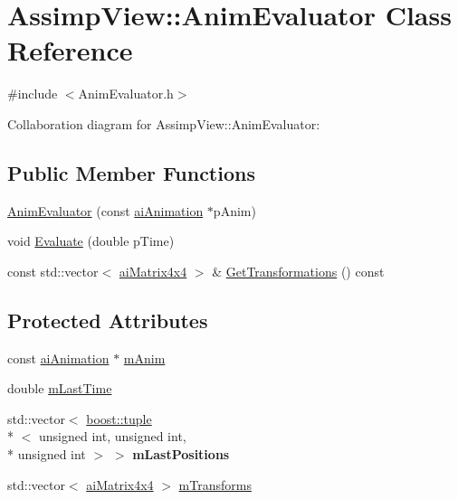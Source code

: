 \hypertarget{class_assimp_view_1_1_anim_evaluator}{\section{Assimp\+View\+:\+:Anim\+Evaluator Class Reference}
\label{class_assimp_view_1_1_anim_evaluator}
}


{\ttfamily \#include $<$Anim\+Evaluator.\+h$>$}



Collaboration diagram for Assimp\+View\+:\+:Anim\+Evaluator\+:
\subsection*{Public Member Functions}
\begin{DoxyCompactItemize}
\item 
\hyperlink{class_assimp_view_1_1_anim_evaluator_a271264baf8bdbb2ca6169be7f2067c59}{Anim\+Evaluator} (const \hyperlink{structai_animation}{ai\+Animation} $\ast$p\+Anim)
\item 
void \hyperlink{class_assimp_view_1_1_anim_evaluator_ad54be6d3b474ab3753b12c6996bc2852}{Evaluate} (double p\+Time)
\item 
const std\+::vector$<$ \hyperlink{structai_matrix4x4}{ai\+Matrix4x4} $>$ \& \hyperlink{class_assimp_view_1_1_anim_evaluator_a7be89e7cca438cbe27ca3038a3be44dd}{Get\+Transformations} () const 
\end{DoxyCompactItemize}
\subsection*{Protected Attributes}
\begin{DoxyCompactItemize}
\item 
const \hyperlink{structai_animation}{ai\+Animation} $\ast$ \hyperlink{class_assimp_view_1_1_anim_evaluator_a0e81ddc2aaa893be9854ba929238072f}{m\+Anim}
\item 
double \hyperlink{class_assimp_view_1_1_anim_evaluator_a5291e158522c7a8e0573fc9fa6a9b82b}{m\+Last\+Time}
\item 
\hypertarget{class_assimp_view_1_1_anim_evaluator_a40bf8e6eb21c2d73b2e13bf78753ee69}{std\+::vector$<$ \hyperlink{classboost_1_1tuple}{boost\+::tuple}\\*
$<$ unsigned int, unsigned int, \\*
unsigned int $>$ $>$ {\bfseries m\+Last\+Positions}}\label{class_assimp_view_1_1_anim_evaluator_a40bf8e6eb21c2d73b2e13bf78753ee69}

\item 
std\+::vector$<$ \hyperlink{structai_matrix4x4}{ai\+Matrix4x4} $>$ \hyperlink{class_assimp_view_1_1_anim_evaluator_ac9a0ebeb03d26956953ddb0001d0544a}{m\+Transforms}
\end{DoxyCompactItemize}



